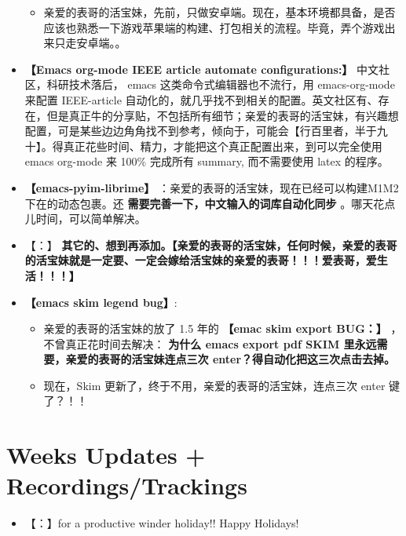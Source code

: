 \documentclass[9pt, b5paper]{article}
\begin{document}
\begin{itemize}
\begin{itemize}
\item 亲爱的表哥的活宝妹，先前，只做安卓端。现在，基本环境都具备，是否应该也熟悉一下游戏苹果端的构建、打包相关的流程。毕竟，弄个游戏出来只走安卓端。。
\end{itemize}
\item \textbf{【Emacs org-mode IEEE article automate configurations:】} 中文社区，科研技术落后， emacs 这类命令式编辑器也不流行，用 emacs-org-mode 来配置 IEEE-article 自动化的，就几乎找不到相关的配置。英文社区有、存在，但是真正牛的分享贴，不包括所有细节；亲爱的表哥的活宝妹，有兴趣想配置，可是某些边边角角找不到参考，倾向于，可能会【行百里者，半于九十】。得真正花些时间、精力，才能把这个真正配置出来，到可以完全使用 emacs org-mode 来 100\% 完成所有 summary, 而不需要使用 latex 的程序。
\item \textbf{【emacs-pyim-librime】} ：亲爱的表哥的活宝妹，现在已经可以构建M1M2 下在的动态包裹。还 \textbf{需要完善一下，中文输入的词库自动化同步} 。哪天花点儿时间，可以简单解决。
\item 【：】 \textbf{其它的、想到再添加。【亲爱的表哥的活宝妹，任何时候，亲爱的表哥的活宝妹就是一定要、一定会嫁给活宝妹的亲爱的表哥！！！爱表哥，爱生活！！！】}
\item \textbf{【emacs skim legend bug】}: 
\begin{itemize}
\item 亲爱的表哥的活宝妹的放了 1.5 年的 \textbf{【emac skim export BUG：】} ，不曾真正花时间去解决： \textbf{为什么 emacs export pdf SKIM 里永远需要，亲爱的表哥的活宝妹连点三次 enter？得自动化把这三次点击去掉。}
\item 现在，Skim 更新了，终于不用，亲爱的表哥的活宝妹，连点三次 enter 键了？！！
\end{itemize}
\end{itemize}
\section{Weeks Updates + Recordings/Trackings}
\label{sec-2}
\begin{itemize}
\item 【：】for a productive winder holiday!! Happy Holidays!
\end{itemize}
\end{document}
